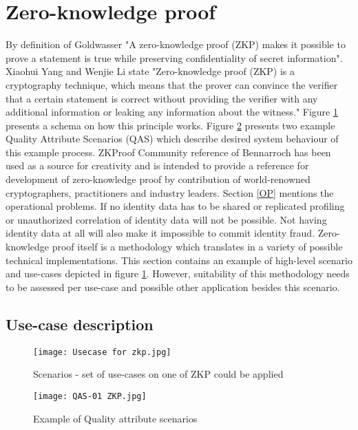 \section{Zero-knowledge proof}
By definition of Goldwasser \etal \cite{Goldwasser} "A zero-knowledge proof (ZKP) makes it possible to prove a statement is true while preserving confidentiality of secret information". 
Xiaohui Yang and Wenjie Li \cite{YANG2020102050} state "Zero-knowledge proof (ZKP) is a cryptography technique, which means that the prover can convince the verifier that a certain statement is correct without providing the verifier with any additional information or leaking any information about the witness." Figure \ref{fig:ZKP_usecase} presents a schema on how this principle works. Figure \ref{fig:QAS01} presents two example Quality Attribute Scenarios (QAS) which describe desired system behaviour of this example process. ZKProof Community reference \cite{2019:zkproof:community-reference-0.2} of Bennarroch \etal has been used as a source for creativity and is intended to provide a reference for development of zero-knowledge proof by contribution of world-renowned cryptographers, practitioners and industry leaders. Section \ref{OP} mentions the operational problems. If no identity data has to be shared or replicated profiling or unauthorized correlation of identity data will not be possible. Not having identity data at all will also make it impossible to commit identity fraud. 
Zero-knowledge proof itself is a methodology which translates in a variety of possible technical implementations. This section contains an example of high-level scenario and use-cases depicted in figure \ref{fig:ZKP_usecase}. However, suitability of this methodology needs to be assessed per use-case and possible other application besides this scenario. 

\subsection{Use-case description}\label{UC_description}
    
    \begin{figure}
    \graphicspath{ {./images/} }
        \texttt{[image: Usecase for zkp.jpg]}\\
        \centering
        \caption{Scenarios - set of use-cases on one of ZKP could be applied}
        \label{fig:ZKP_usecase}
    \end{figure}


    \begin{figure}
        \graphicspath{ {./images/} }
        \centering
        \texttt{[image: QAS-01 ZKP.jpg]}\\
        \caption{Example of Quality attribute scenarios}
        \label{fig:QAS01}
    \end{figure}

